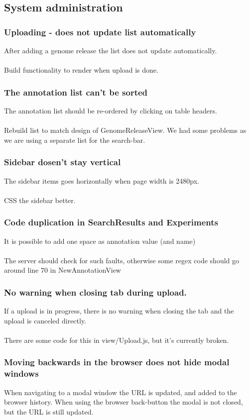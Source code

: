 \subsection{System administration}
\subsubsection{Uploading - does not update list automatically}
After adding a genome release the list does not update automatically. \\
\\
Build functionality to render when upload is done. 
\subsubsection{The annotation list can't be sorted}
The annotation list should be re-ordered by clicking on table headers. \\
\\
Rebuild list to match design of GenomeReleaseView. We had some problems as we are using a separate list for the search-bar.
\subsubsection{Sidebar dosen't stay vertical}
The sidebar items goes horizontally when page width is 2480px. \\
\\
CSS the sidebar better. 
\subsubsection{Code duplication in SearchResults and Experiments}
It is possible to add one space as annotation value (and name) \\
\\
The server should check for such faults, otherwise some regex code should go around line 70 in NewAnnotationView
\subsubsection{No warning when closing tab during upload.}
If a upload is in progress, there is no warning when closing the tab and the upload is canceled directly. \\
\\
There are some code for this in view/Upload.js, but it's currently broken.
\subsubsection{Moving backwards in the browser does not hide modal windows}
When navigating to a modal window the URL is updated, and added to the browser history. When using the browser back-button the modal is not closed, but the URL is still updated. \\
\\
